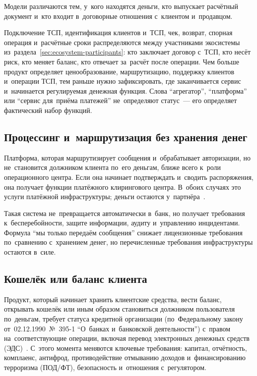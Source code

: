 Модели различаются тем, у~кого находятся деньги, кто выпускает расчётный
документ и~кто входит в~договорные отношения с~клиентом и~продавцом.

Подключение ТСП, идентификация клиентов и~ТСП, чек, возврат, спорная операция
и~расчётные сроки распределяются между участниками экосистемы
из~раздела~\ref{sec:ecosystem-participants}: кто заключает договор с~ТСП, кто
несёт риск, кто меняет баланс, кто отвечает за~расчёт после операции. Чем
больше продукт определяет ценообразование, маршрутизацию, поддержку клиентов
и~операции ТСП, тем раньше нужно зафиксировать, где заканчивается сервис
и~начинается регулируемая денежная функция. Слова \enquote{агрегатор},
\enquote{платформа} или \enquote{сервис для~приёма платежей} не~определяют
статус~--- его определяет фактический набор функций.

\subsection*{Процессинг и~маршрутизация без хранения денег}

Платформа, которая маршрутизирует сообщения и~обрабатывает авторизации, но
не~становится должником клиента по~его деньгам, ближе всего к~роли
операционного центра. Если она начинает подтверждать и~сводить распоряжения,
она получает функции платёжного клирингового центра. В~обоих случаях это услуги
платёжной инфраструктуры; деньги остаются у~партнёра~\cite{fz-161}.

Такая система не~превращается автоматически в~банк, но получает требования
к~бесперебойности, защите информации, аудиту и~управлению инцидентами. Формула
\enquote{мы только передаём сообщения} снижает лицензионные требования
по~сравнению с~хранением денег, но перечисленные требования инфраструктуры
остаются в~силе.

\subsection*{Кошелёк или баланс клиента}

Продукт, который начинает хранить клиентские средства, вести баланс, открывать
кошелёк или иным образом становиться должником пользователя по~деньгам,
требует статуса кредитной организации (по~Федеральному закону
от~02.12.1990~№~395-1 \enquote{О~банках и~банковской деятельности}) с~правом
на~соответствующие операции, включая перевод электронных денежных средств
(ЭДС)~\cite{fz-161,fz-395-1}. С~этого момента меняются ключевые требования:
капитал, отчётность, комплаенс, антифрод, противодействие отмыванию доходов
и~финансированию терроризма (ПОД/ФТ), безопасность и~отношения с~регулятором.

